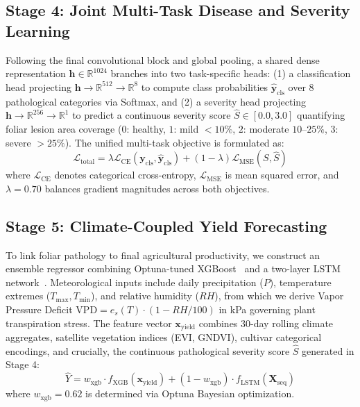 \documentclass[conference]{IEEEtran}
\begin{document}
\subsection{Stage 4: Joint Multi-Task Disease and Severity Learning}
Following the final convolutional block and global pooling, a shared dense representation $\mathbf{h} \in \mathbb{R}^{1024}$ branches into two task-specific heads: (1) a classification head projecting $\mathbf{h} \to \mathbb{R}^{512} \to \mathbb{R}^8$ to compute class probabilities $\hat{\mathbf{y}}_{\text{cls}}$ over 8 pathological categories via Softmax, and (2) a severity head projecting $\mathbf{h} \to \mathbb{R}^{256} \to \mathbb{R}^1$ to predict a continuous severity score $\hat{S} \in [0.0, 3.0]$ quantifying foliar lesion area coverage ($0$: healthy, $1$: mild $<10\%$, $2$: moderate $10$--$25\%$, $3$: severe $>25\%$). The unified multi-task objective is formulated as:
\begin{equation}
\mathcal{L}_{\text{total}} = \lambda \mathcal{L}_{\text{CE}}(\mathbf{y}_{\text{cls}}, \hat{\mathbf{y}}_{\text{cls}}) + (1 - \lambda) \mathcal{L}_{\text{MSE}}(S, \hat{S})
\end{equation}
where $\mathcal{L}_{\text{CE}}$ denotes categorical cross-entropy, $\mathcal{L}_{\text{MSE}}$ is mean squared error, and $\lambda = 0.70$ balances gradient magnitudes across both objectives.

\subsection{Stage 5: Climate-Coupled Yield Forecasting}
To link foliar pathology to final agricultural productivity, we construct an ensemble regressor combining Optuna-tuned XGBoost~\cite{chen2016xgboost} and a two-layer LSTM network~\cite{hochreiter1997long}. Meteorological inputs include daily precipitation ($P$), temperature extremes ($T_{\text{max}}, T_{\text{min}}$), and relative humidity ($RH$), from which we derive Vapor Pressure Deficit $\text{VPD} = e_s(T) \cdot (1 - RH/100)$ in kPa governing plant transpiration stress. The feature vector $\mathbf{x}_{\text{yield}}$ combines 30-day rolling climate aggregates, satellite vegetation indices (EVI, GNDVI), cultivar categorical encodings, and crucially, the continuous pathological severity score $\hat{S}$ generated in Stage 4:
\begin{equation}
\hat{Y} = w_{\text{xgb}} \cdot f_{\text{XGB}}(\mathbf{x}_{\text{yield}}) + (1 - w_{\text{xgb}}) \cdot f_{\text{LSTM}}(\mathbf{X}_{\text{seq}})
\end{equation}
where $w_{\text{xgb}} = 0.62$ is determined via Optuna Bayesian optimization.
\end{document}
